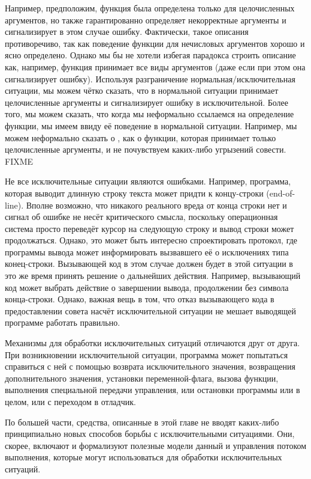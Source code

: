Например, предположим, функция  была определена только для целочисленных
аргументов, но также гарантированно определяет некорректные аргументы и
сигнализирует в этом случае ошибку. Фактически, такое описания противоречиво,
так как поведение функции для нечисловых аргументов хорошо и ясно
определено. Однако мы бы не хотели избегая парадокса строить описание как,
например, функция  принимает все виды аргументов (даже если при этом она
сигнализирует ошибку). Используя разграничение нормальная/исключительная
ситуации, мы можем чётко сказать, что  в нормальной ситуации принимает
целочисленные аргументы и сигнализирует ошибку в исключительной. Более того, мы
можем сказать, что когда мы неформально ссылаемся на определение функции, мы
имеем ввиду её поведение в нормальной ситуации. Например, мы можем неформально
сказать о , как о функции, которая принимает только целочисленные
аргументы, и не почувствуем каких-либо угрызений совести. FIXME

Не все исключительные ситуации являются ошибками. Например, программа, которая
выводит длинную строку текста может придти к концу-строки (end-of-line).  Вполне
возможно, что никакого реального вреда от конца строки нет и сигнал об ошибке не
несёт критического смысла, поскольку операционная система просто переведёт
курсор на следующую строку и вывод строки может продолжаться. Однако, это может
быть интересно спроектировать протокол, где программы вывода может информировать
вызвавшего её о исключениях типа конец-строки. Вызывающей код в этом случае
должен будет в этой ситуации в это же время принять решение о дальнейших
действия. Например, вызывающий код может выбрать действие о завершении вывода,
продолжении без символа конца-строки. Однако, важная вещь в том, что отказ
вызывающего кода в предоставлении совета насчёт исключительной ситуации не
мешает выводящей программе работать правильно.

Механизмы для обработки исключительных ситуаций отличаются друг от друга. При
возникновении исключительной ситуации, программа может попытаться справиться с
ней с помощью возврата исключительного значения, возвращения дополнительного
значения, установки переменной-флага, вызова функции, выполнения специальной
передачи управления, или остановки программы или в целом, или с переходом в
отладчик.

По большей части, средства, описанные в этой главе не вводят каких-либо
принципиально новых способов борьбы с исключительными ситуациями. Они, скорее,
включают и формализуют полезные модели данный и управления потоком выполнения,
которые могут использоваться для обработки исключительных ситуаций.


